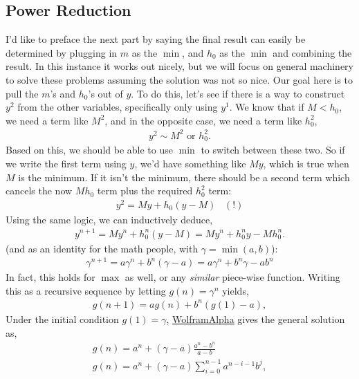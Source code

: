 \documentclass[../../main.tex]{subfiles}
\begin{document}
			\subsection{Power Reduction}
				I'd like to preface the next part by saying the final result can easily be determined by plugging in $m$ as the $\min$, and $h_0$ as the $\min$ and combining the result. In this instance it works out nicely, but we will focus on general machinery to solve these problems assuming the solution was not so nice. Our goal here is to pull the $m$'s and $h_0$'s out of $y$. To do this, let's see if there is a way to construct $y^2$ from the other variables, specifically only using $y^1$. We know that if $M < h_0$, we need a term like $M^2$, and in the opposite case, we need a term like $h_0^2$,
				\begin{align}
					y^2 \sim M^2 \text{ or } h_0^2.
				\end{align}
				Based on this, we should be able to use $\min$ to switch between these two. So if we write the first term using $y$, we'd have something like $My$, which is true when $M$ is the minimum. If it isn't the minimum, there should be a second term which cancels the now $Mh_0$ term plus the required $h_0^2$ term:
				\begin{align}
					y^2 = My + h_0(y - M)\,\,\,\,\,(!)
				\end{align}
				Using the same logic, we can inductively deduce,
				\begin{align}
					\boxed{y^{n+1} = My^n + h_0^n(y - M) = My^n + h_0^ny - Mh_0^n.}
				\end{align}
				(and as an identity for the math people, with $\gamma = \min(a, b)$):
				\begin{align}
					\boxed{\gamma^{n+1} = a\gamma^n + b^n(\gamma - a) = a\gamma^n + b^n\gamma - ab^n}
				\end{align}
				In fact, this holds for $\max$ as well, or any \emph{similar} piece-wise function.
				Writing this as a recursive sequence by letting $g(n)=\gamma^n$ yields,
				\begin{align}
					g(n+1) = ag(n) + b^n(g(1) - a),
				\end{align}
				Under the initial condition $g(1)=\gamma$, \href{https://www.wolframalpha.com/input/?i=g%28n%2B1%29%3Da*g%28n%29%2Bb%5En%28C-a%29}{WolframAlpha} gives the general solution as,
				\begin{align}
					g(n) = a^n + (\gamma - a)\frac{a^n - b^n}{a - b} \\
					\boxed{g(n) = a^n + (\gamma - a)\sum_{i=0}^{n-1} a^{n-i-1}b^j,}
				\end{align}
\end{document}
